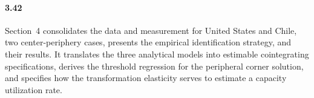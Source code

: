 \paragraph{3.42}
Section~4 consolidates the data and measurement for United States and Chile, two center-periphery cases, presents the empirical identification
strategy, and their results. It translates the three analytical models into
estimable cointegrating specifications, derives the
threshold regression for the peripheral corner solution,
and specifies how the transformation elasticity serves to estimate a capacity utilization rate. 